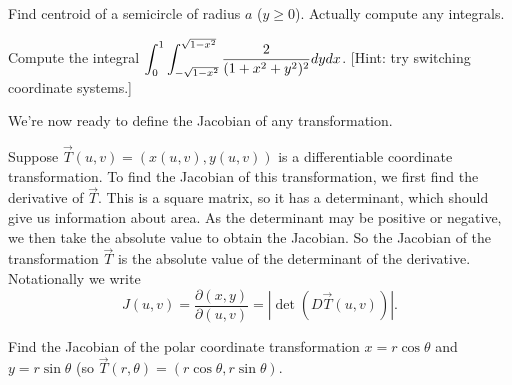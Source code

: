 \begin{problem}
Find centroid of a semicircle of radius $a$ ($y\geq 0$). Actually compute any integrals.   
\end{problem}

\begin{problem}
Compute the integral $\displaystyle \int_{0}^{1}\int_{-\sqrt{1-x^2}}^{\sqrt{1-x^2}} \frac{2}{(1+x^2+y^2)^2}dydx$. [Hint: try switching coordinate systems.]
\end{problem}




We're now ready to define the Jacobian of any transformation.
\begin{definition}
 Suppose $\vec T(u,v)=(x(u,v),y(u,v))$ is a differentiable coordinate transformation. To find the Jacobian of this transformation, we first find the derivative of $\vec T$.  This is a square matrix, so it has a determinant, which should give us information about area. As the determinant may be positive or negative, we then take the absolute value to obtain the Jacobian.  So the Jacobian of the transformation $\vec T$ is the absolute value of the determinant of the derivative. 
 Notationally we write 
$$J(u,v) = \frac{\partial (x,y)}{\partial (u,v)} = |\det(D\vec T(u,v))|.$$
\end{definition}

\begin{problem}
 Find the Jacobian of the polar coordinate transformation $x=r\cos\theta$ and $y=r\sin\theta$ (so $\vec T(r,\theta)=(r\cos\theta,r\sin\theta)$.
\end{problem}

